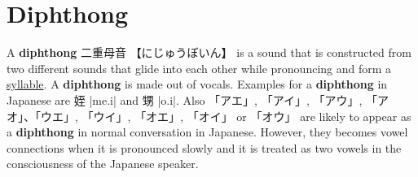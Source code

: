 \section{Diphthong} \label{sec:Diphthong}

A \textbf{diphthong} {二重母音} {【にじゅうぼいん】} is a sound that is
constructed from two different sounds that glide into each other while
pronouncing and form a \hyperref[sec:Syllabble]{syllable}. A \textbf{diphthong}
is made out of vocals.  Examples for a \textbf{diphthong} in Japanese are {姪}
|me.i| and {甥} |o.i|.  Also  {「アエ」}, {「アイ」}, {「アウ」},
{「アオ」}、{「ウエ」}, {「ウイ」}, {「オエ」}, {「オイ」} or {「オウ」} are
likely to appear as a \textbf{diphthong} in normal conversation in Japanese.
However, they becomes vowel connections when it is pronounced slowly and it is
treated as two vowels in the consciousness of the Japanese speaker.
